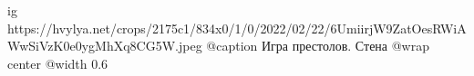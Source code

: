  
 
 
 
 

\ifcmt
  ig https://hvylya.net/crops/2175c1/834x0/1/0/2022/02/22/6UmiirjW9ZatOesRWiAWwSiVzK0e0ygMhXq8CG5W.jpeg
  @caption Игра престолов. Стена
	@wrap center
	@width 0.6
\fi
